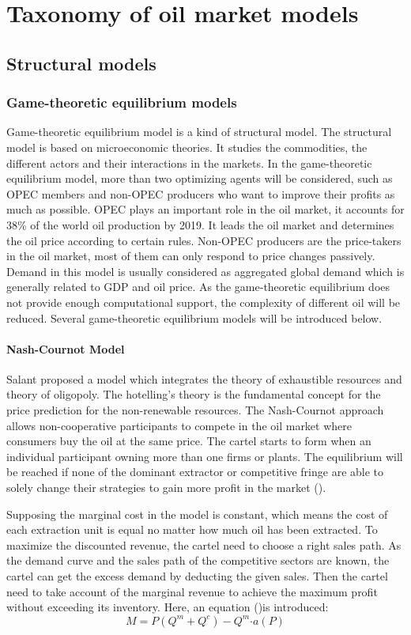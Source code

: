 \chapter{Taxonomy of oil market models}

\section{Structural models}

\subsection{Game-theoretic equilibrium models}
Game-theoretic equilibrium model is a kind of structural model. The structural model is based on microeconomic theories. It studies the commodities, the different actors and their interactions in the markets. In the game-theoretic equilibrium model, more than two optimizing agents will be considered, such as OPEC members and non-OPEC producers who want to improve their profits as much as possible. OPEC plays an important role in the oil market, it accounts for 38\% of the world oil production by 2019. It leads the oil market and determines the oil price according to certain rules. Non-OPEC producers are the price-takers in the oil market, most of them can only respond to price changes passively. Demand in this model is usually considered as aggregated global demand which is generally related to GDP and oil price. As the game-theoretic equilibrium does not provide enough computational support, the complexity of different oil will be reduced. Several game-theoretic equilibrium models will be introduced below.
\subsubsection{Nash-Cournot Model}
Salant proposed a model which integrates the theory of exhaustible resources and theory of oligopoly. The hotelling's theory is the fundamental concept for the price prediction for the non-renewable resources. The Nash-Cournot approach allows non-cooperative participants to compete in the oil market where consumers buy the oil at the same price. The cartel starts to form when an individual participant owning more than one firms or plants. The equilibrium will be reached if none of the dominant extractor or competitive fringe are able to solely change their strategies to gain more profit in the market (\cite{salant1976exhaustible}). 

Supposing the marginal cost in the model is constant, which means the cost of each extraction unit is equal no matter how much oil has been extracted. To maximize the discounted revenue, the cartel need to choose a right sales path. As the demand curve and the sales path of the competitive sectors are known, the cartel can get the excess demand by deducting the given sales. Then the cartel need to take account of the marginal revenue to achieve the maximum profit without exceeding its inventory. Here, an equation (\cite{salant1976exhaustible})is introduced:
\[M=P(Q^m+ Q^c )-Q^m\boldsymbol{\cdot}a(P)\] 

